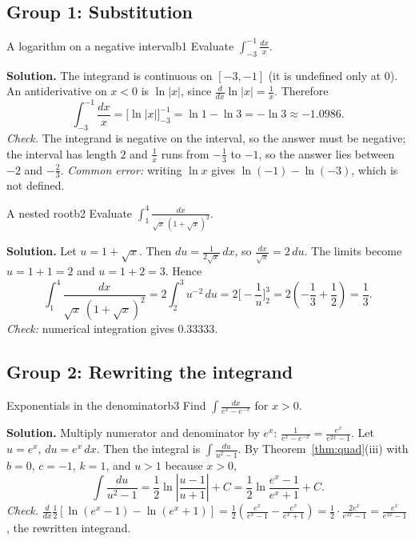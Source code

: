 \documentclass[11pt]{article}
\begin{document}
\subsection*{Group 1: Substitution}

\begin{exmp}{A logarithm on a negative interval}{b1}
Evaluate $\int_{-3}^{-1}\frac{dx}x$.

\textbf{Solution.} The integrand is continuous on $[-3,-1]$ (it is undefined only at $0$). An antiderivative on $x<0$ is $\ln\lvert x\rvert$, since $\frac{d}{dx}\ln\lvert x\rvert=\frac1x$. Therefore
\[\int_{-3}^{-1}\frac{dx}x=\Big[\ln\lvert x\rvert\Big]_{-3}^{-1}=\ln1-\ln3=-\ln3\approx-1.0986 .\]
\emph{Check.} The integrand is negative on the interval, so the answer must be negative; the interval has length $2$ and $\frac1x$ runs from $-\frac13$ to $-1$, so the answer lies between $-2$ and $-\frac23$. \emph{Common error:} writing $\ln x$ gives $\ln(-1)-\ln(-3)$, which is not defined.
\end{exmp}

\begin{exmp}{A nested root}{b2}
Evaluate $\int_1^4\frac{dx}{\sqrt x\,(1+\sqrt x)^2}$.

\textbf{Solution.} Let $u=1+\sqrt x$. Then $du=\frac1{2\sqrt x}\,dx$, so $\frac{dx}{\sqrt x}=2\,du$. The limits become $u=1+1=2$ and $u=1+2=3$. Hence
\[\int_1^4\frac{dx}{\sqrt x\,(1+\sqrt x)^2}=2\int_2^3u^{-2}\,du=2\Big[-\frac1u\Big]_2^3=2\left(-\frac13+\frac12\right)=\frac13 .\]
\emph{Check:} numerical integration gives $0.33333$.
\end{exmp}

\subsection*{Group 2: Rewriting the integrand}

\begin{exmp}{Exponentials in the denominator}{b3}
Find $\int\frac{dx}{e^x-e^{-x}}$ for $x>0$.

\textbf{Solution.} Multiply numerator and denominator by $e^x$: $\frac1{e^x-e^{-x}}=\frac{e^x}{e^{2x}-1}$. Let $u=e^x$, $du=e^x\,dx$. Then the integral is $\int\frac{du}{u^2-1}$. By Theorem~\ref{thm:quad}(iii) with $b=0$, $c=-1$, $k=1$, and $u>1$ because $x>0$,
\[\int\frac{du}{u^2-1}=\frac12\ln\left\lvert\frac{u-1}{u+1}\right\rvert+C=\frac12\ln\frac{e^x-1}{e^x+1}+C .\]
\emph{Check.} $\frac{d}{dx}\frac12\left[\ln(e^x-1)-\ln(e^x+1)\right]=\frac12\left(\frac{e^x}{e^x-1}-\frac{e^x}{e^x+1}\right)=\frac12\cdot\frac{2e^x}{e^{2x}-1}=\frac{e^x}{e^{2x}-1}$, the rewritten integrand.
\end{exmp}
\end{document}

